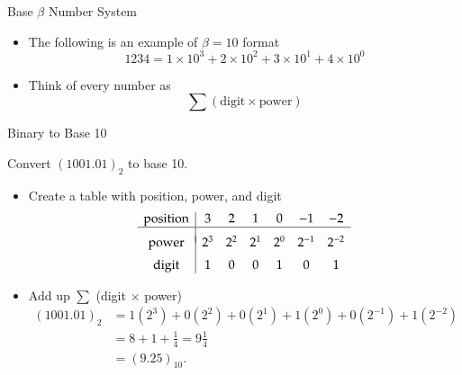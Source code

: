\documentclass[10pt]{beamer}
\begin{document}
\begin{frame}{Base $\beta$ Number System}
  \begin{itemize}
    \item The following is an example of  $\beta=10$ format
        $$        1234 = 1\times 10^3+2 \times10^2+3\times 10^1+4\times10^0$$
    \item Think of every number as 
    $$
    \sum (\text{digit} \times \text{power})
    $$

  \end{itemize}
\end{frame}
\begin{frame}{Binary to Base 10}

\begin{example}
Convert $(1001.01)_2$ to base 10.
\end{example}

\begin{itemize}
    \item Create a table with position, power, and digit
\[
\begin{array}{c|cccccc}
\text{position} & 3 & 2 & 1 & 0 & -1 & -2\\
\hline\\[-2mm]
\text{power} & 2^3 & 2^2 & 2^1 & 2^0 & 2^{-1} & 2^{-2}\\[2mm]
\text{digit} & 1 & 0 & 0 & 1 & 0 & 1
\end{array}
\]
    \item Add up $\sum$ (digit $\times$ power)
\begin{align*}
(1001.01)_2 &=1(2^3)+0(2^2)+0(2^1)+1(2^0) +0(2^{-1})+1(2^{-2})\\
        &=8+1+\frac14=9\frac{1}{4}\\
&=(9.25)_{10}.
\end{align*}

\end{itemize}
\end{frame}
\end{document}
